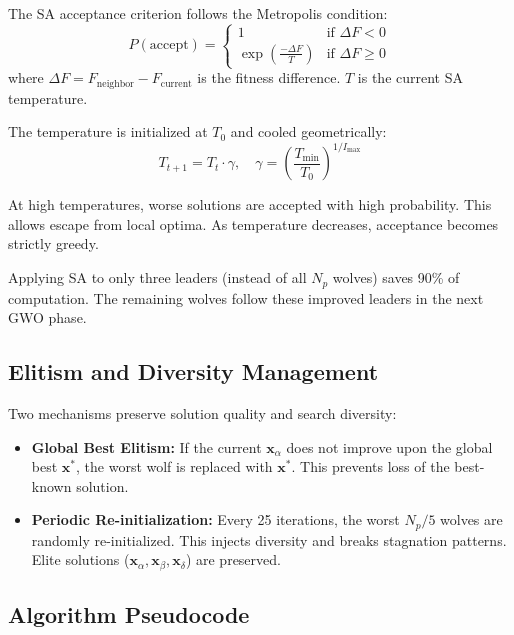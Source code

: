 \documentclass[conference]{IEEEtran}
\begin{document}
The SA acceptance criterion follows the Metropolis condition:
\begin{equation}
    P(\text{accept}) =
    \begin{cases}
        1 & \text{if } \Delta F < 0 \\
        \exp\!\left(\frac{-\Delta F}{T}\right) & \text{if } \Delta F \geq 0
    \end{cases}
    \label{eq:sa_accept}
\end{equation}
where $\Delta F = F_{\text{neighbor}} - F_{\text{current}}$ is the fitness difference.
$T$ is the current SA temperature.

The temperature is initialized at $T_0$ and cooled geometrically:
\begin{equation}
    T_{t+1} = T_t \cdot \gamma, \quad \gamma = \left(\frac{T_{\min}}{T_0}\right)^{1/I_{\max}}
    \label{eq:cooling}
\end{equation}

At high temperatures, worse solutions are accepted with high probability.
This allows escape from local optima.
As temperature decreases, acceptance becomes strictly greedy.

Applying SA to only three leaders (instead of all $N_p$ wolves) saves 90\% of computation.
The remaining wolves follow these improved leaders in the next GWO phase.


\subsection{Elitism and Diversity Management}

Two mechanisms preserve solution quality and search diversity:

\begin{itemize}
    \item \textbf{Global Best Elitism:}
    If the current $\mathbf{x}_\alpha$ does not improve upon the global best $\mathbf{x}^*$,
    the worst wolf is replaced with $\mathbf{x}^*$.
    This prevents loss of the best-known solution.

    \item \textbf{Periodic Re-initialization:}
    Every 25 iterations, the worst $N_p / 5$ wolves are randomly re-initialized.
    This injects diversity and breaks stagnation patterns.
    Elite solutions ($\mathbf{x}_\alpha, \mathbf{x}_\beta, \mathbf{x}_\delta$) are preserved.
\end{itemize}


\subsection{Algorithm Pseudocode}
\end{document}
